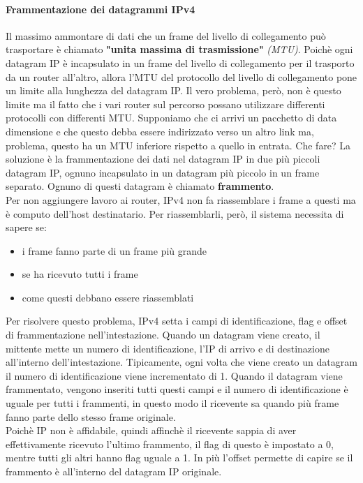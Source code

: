 \documentclass[11pt,a4paper]{article}
\begin{document}
\paragraph{Frammentazione dei datagrammi IPv4}
Il massimo ammontare di dati che un frame del livello di collegamento può trasportare è chiamato \textbf{"unita massima di trasmissione"} \textit{(MTU)}. Poichè ogni datagram IP è incapsulato in un frame del livello di collegamento per il trasporto da un router all'altro, allora l'MTU del protocollo del livello di collegamento pone un limite alla lunghezza del datagram IP. Il vero problema, però, non è questo limite ma il fatto che i vari router sul percorso possano utilizzare differenti protocolli con differenti MTU. Supponiamo che ci arrivi un pacchetto di data dimensione e che questo debba essere indirizzato verso un altro link ma, problema, questo ha un MTU inferiore rispetto a quello in entrata. Che fare? La soluzione è la frammentazione dei dati nel datagram IP in due più piccoli datagram IP, ognuno incapsulato in un datagram più piccolo in un frame separato. Ognuno di questi datagram è chiamato \textbf{frammento}. \\
Per non aggiungere lavoro ai router, IPv4 non fa riassemblare i frame a questi ma è computo dell'host destinatario. Per riassemblarli, però, il sistema necessita di sapere se:
\begin{itemize}
	\item i frame fanno parte di un frame più grande
	\item se ha ricevuto tutti i frame
	\item come questi debbano essere riassemblati
\end{itemize} 
Per risolvere questo problema, IPv4 setta i campi di identificazione, flag e offset di frammentazione nell'intestazione. Quando un datagram viene creato, il mittente mette un numero di identificazione, l'IP di arrivo e di destinazione all'interno dell'intestazione. Tipicamente, ogni volta che viene creato un datagram il numero di identificazione viene incrementato di 1. Quando il datagram viene frammentato, vengono inseriti tutti questi campi e il numero di identificazione è uguale per tutti i frammenti, in questo modo il ricevente sa quando più frame fanno parte dello stesso frame originale. \\
Poichè IP non è affidabile, quindi affinchè il ricevente sappia di aver effettivamente ricevuto l'ultimo frammento, il flag di questo è impostato a 0, mentre tutti gli altri hanno flag uguale a 1. In più l'offset permette di capire se il frammento è all'interno del datagram IP originale. \\
\end{document}
